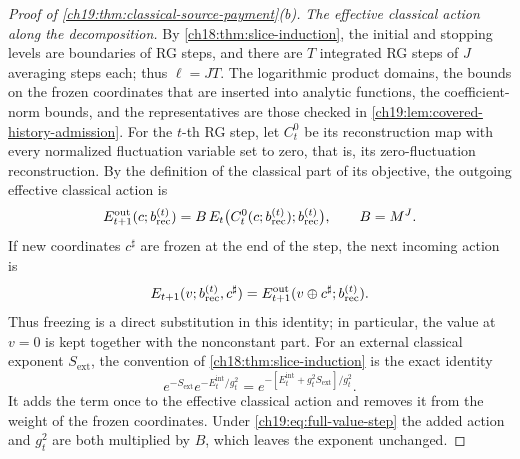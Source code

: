 \begin{proof}[Proof of \cref{ch19:thm:classical-source-payment}(b)]
\emph{The effective classical action along the decomposition.} By \cref{ch18:thm:slice-induction}, the initial and stopping levels are boundaries of RG steps, and there are $T$ integrated RG steps of $J$ averaging steps each; thus $\ell=JT$. The logarithmic product domains, the bounds on the frozen coordinates that are inserted into analytic functions, the coefficient-norm bounds, and the representatives are those checked in \cref{ch19:lem:covered-history-admission}. For the $t$-th RG step, let $C_t^0$ be its reconstruction map with every normalized fluctuation variable set to zero, that is, its zero-fluctuation reconstruction. By the definition of the classical part of its objective, the outgoing effective classical action is
\begin{equation}\label{ch19:eq:full-value-step}
 E_{t+1}^{\mathrm{out}}(c;b_{\mathrm{rec}}^{(t)})=B\,E_t\bigl(C_t^0(c;b_{\mathrm{rec}}^{(t)});b_{\mathrm{rec}}^{(t)}\bigr),\qquad B=M^J.
\end{equation}
If new coordinates $c^\sharp$ are frozen at the end of the step, the next incoming action is
\[
 E_{t+1}(v;b_{\mathrm{rec}}^{(t)},c^\sharp)=E_{t+1}^{\mathrm{out}}(v\oplus c^\sharp;b_{\mathrm{rec}}^{(t)}).
\]
Thus freezing is a direct substitution in this identity; in particular, the value at $v=0$ is kept together with the nonconstant part. For an external classical exponent $S_{\mathrm{ext}}$, the convention of \cref{ch18:thm:slice-induction} is the exact identity
\[
 e^{-S_{\mathrm{ext}}}e^{-E_t^{\mathrm{int}}/g_t^2}=e^{-[E_t^{\mathrm{int}}+g_t^2S_{\mathrm{ext}}]/g_t^2}.
\]
It adds the term once to the effective classical action and removes it from the weight of the frozen coordinates. Under \eqref{ch19:eq:full-value-step} the added action and $g_t^2$ are both multiplied by $B$, which leaves the exponent unchanged.


\end{proof}
